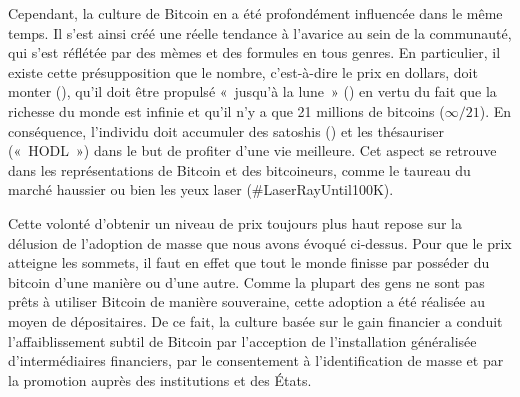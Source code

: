 Cependant, la culture de Bitcoin en a été profondément influencée dans le même temps. Il s'est ainsi créé une réelle tendance à l'avarice au sein de la communauté, qui s'est réflétée par des mèmes et des formules en tous genres. En particulier, il existe cette présupposition que le nombre, c'est-à-dire le prix en dollars, doit monter (), qu'il doit être propulsé «~jusqu'à la lune~» () en vertu du fait que la richesse du monde est infinie et qu'il n'y a que 21 millions de bitcoins ($\infty / 21$). En conséquence, l'individu doit accumuler des satoshis () et les thésauriser («~HODL~») dans le but de profiter d'une vie meilleure. Cet aspect se retrouve dans les représentations de Bitcoin et des bitcoineurs, comme le taureau du marché haussier ou bien les yeux laser (\#LaserRayUntil100K). %

Cette volonté d'obtenir un niveau de prix toujours plus haut repose sur la délusion de l'adoption de masse que nous avons évoqué ci-dessus. Pour que le prix atteigne les sommets, il faut en effet que tout le monde finisse par posséder du bitcoin d'une manière ou d'une autre. Comme la plupart des gens ne sont pas prêts à utiliser Bitcoin de manière souveraine, cette adoption a été réalisée au moyen de dépositaires. De ce fait, la culture basée sur le gain financier a conduit l'affaiblissement subtil de Bitcoin par l'acception de l'installation généralisée d'intermédiaires financiers, par le consentement à l'identification de masse et par la promotion auprès des institutions et des États. %

